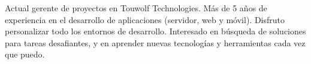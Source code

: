 
\begin{cvparagraph}

Actual gerente de proyectos en Touwolf Technologies. Más de 5 años de experiencia en el desarrollo de aplicaciones (servidor, web y móvil). Disfruto personalizar todo los entornos de desarrollo. Interesado en búsqueda de soluciones para tareas desafiantes, y en aprender nuevas tecnologías y herramientas cada vez que puedo.
\end{cvparagraph}
